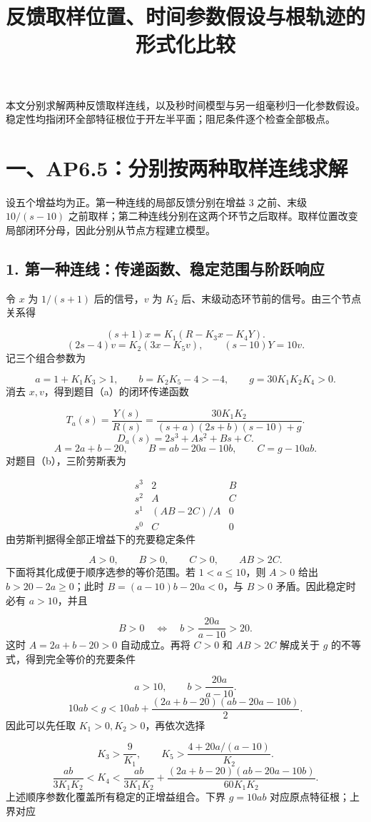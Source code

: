 \documentclass[UTF8,a4paper,11pt]{ctexart}
\title{反馈取样位置、时间参数假设与根轨迹的形式化比较}
\author{}
\date{}
\begin{document}
\maketitle
本文分别求解两种反馈取样连线，以及秒时间模型与另一组毫秒归一化参数假设。稳定性均指闭环全部特征根位于开左半平面；阻尼条件逐个检查全部极点。
\section*{一、AP6.5：分别按两种取样连线求解}
设五个增益均为正。第一种连线的局部反馈分别在增益 $3$ 之前、末级 $10/(s-10)$ 之前取样；第二种连线分别在这两个环节之后取样。取样位置改变局部闭环分母，因此分别从节点方程建立模型。

\subsection*{1. 第一种连线：传递函数、稳定范围与阶跃响应}
令 $x$ 为 $1/(s+1)$ 后的信号，$v$ 为 $K_2$ 后、末级动态环节前的信号。由三个节点关系得

\[(s+1)x=K_1(R-K_3x-K_4Y).\]
\[(2s-4)v=K_2(3x-K_5v),\qquad (s-10)Y=10v.\]
记三个组合参数为

\[a=1+K_1K_3>1,\qquad b=K_2K_5-4>-4,\qquad g=30K_1K_2K_4>0.\]
消去 $x,v$，得到题目（a）的闭环传递函数

\[T_a(s)=\frac{Y(s)}{R(s)}=\frac{30K_1K_2}{(s+a)(2s+b)(s-10)+g}.\]
\[D_a(s)=2s^3+As^2+Bs+C.\]
\[A=2a+b-20,\qquad B=ab-20a-10b,\qquad C=g-10ab.\]
对题目（b），三阶劳斯表为

\[\begin{array}{c|cc}s^3&2&B\\s^2&A&C\\s^1&(AB-2C)/A&0\\s^0&C&0\end{array}\]
由劳斯判据得全部正增益下的充要稳定条件

\[A>0,\qquad B>0,\qquad C>0,\qquad AB>2C.\]
下面将其化成便于顺序选参的等价范围。若 $1<a\le10$，则 $A>0$ 给出 $b>20-2a\ge0$；此时 $B=(a-10)b-20a<0$，与 $B>0$ 矛盾。因此稳定时必有 $a>10$，并且

\[B>0\quad\Longleftrightarrow\quad b>\frac{20a}{a-10}>20.\]
这时 $A=2a+b-20>0$ 自动成立。再将 $C>0$ 和 $AB>2C$ 解成关于 $g$ 的不等式，得到完全等价的充要条件

\[a>10,\qquad b>\frac{20a}{a-10}.\]
\[10ab<g<10ab+\frac{(2a+b-20)(ab-20a-10b)}{2}.\]
因此可以先任取 $K_1>0,K_2>0$，再依次选择

\[K_3>\frac9{K_1},\qquad K_5>\frac{4+20a/(a-10)}{K_2}.\]
\[\frac{ab}{3K_1K_2}<K_4<\frac{ab}{3K_1K_2}+\frac{(2a+b-20)(ab-20a-10b)}{60K_1K_2}.\]
上述顺序参数化覆盖所有稳定的正增益组合。下界 $g=10ab$ 对应原点特征根；上界对应
\end{document}
